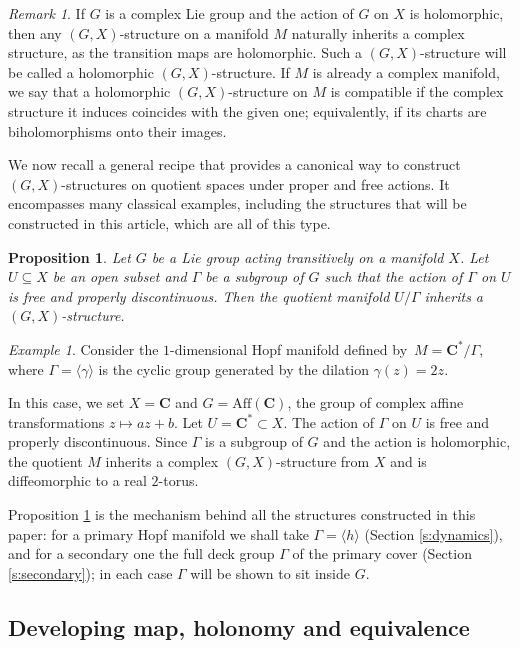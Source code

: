 \documentclass[english,11pt]{amsart}
\newtheorem{proposition}[theorem]{Proposition}
\theoremstyle{definition}
\theoremstyle{remark}
\newtheorem{remark}[theorem]{Remark}
\newtheorem{example}[theorem]{Example}
\numberwithin{equation}{section}
\newcommand{\C}{\mathbf{C}}
\begin{document}
\begin{remark}
If $G$ is a complex Lie group and the action of $G$ on $X$ is holomorphic, then any $(G,X)$-structure on a manifold $M$ naturally inherits a complex structure, as the transition maps are holomorphic. Such a $(G,X)$-structure will be called a holomorphic $(G,X)$-structure. If $M$ is already a complex manifold, we say that a holomorphic $(G,X)$-structure on $M$ is compatible if the complex structure it induces coincides with the given one; equivalently, if its charts are biholomorphisms onto their images.
\end{remark}


We now recall a general recipe that provides a canonical way to construct $(G,X)$-structures on quotient spaces under proper and free actions. It encompasses many classical examples, including the structures that will be constructed in this article, which are all of this type.

\begin{proposition} \label{p:structure quotient}
Let $G$ be a Lie group acting transitively on a manifold $X$. Let $U \subseteq X$ be an open subset and $\Gamma$ be a subgroup of $G$ such that the action of $\Gamma$ on $U$ is free and properly discontinuous. Then the quotient manifold $U/\Gamma$ inherits a $(G,X)$-structure.
\end{proposition}
\begin{example}
Consider the $1$-dimensional Hopf manifold defined by~$M = \C^* / \Gamma$, where $\Gamma = \langle \gamma \rangle$ is the cyclic group generated by the dilation $\gamma(z) = 2z$.

In this case, we set $X = \C$ and $G = \text{Aff}(\C)$, the group of complex affine transformations $z \mapsto az + b$. Let $U = \C^* \subset X$. The action of $\Gamma$ on $U$ is free and properly discontinuous. Since $\Gamma$ is a subgroup of $G$ and the action is holomorphic, the quotient $M$ inherits a complex $(G,X)$-structure from $X$ and is diffeomorphic to a real $2$-torus.
\end{example}

Proposition \ref{p:structure quotient} is the mechanism behind all the structures constructed in this paper: for a primary Hopf manifold we shall take $\Gamma=\langle h\rangle$ (Section \ref{s:dynamics}), and for a secondary one the full deck group $\Gamma$ of the primary cover (Section \ref{s:secondary}); in each case $\Gamma$ will be shown to sit inside $G$.

\subsection{Developing map, holonomy and equivalence}\label{ss:devhol}
\end{document}
